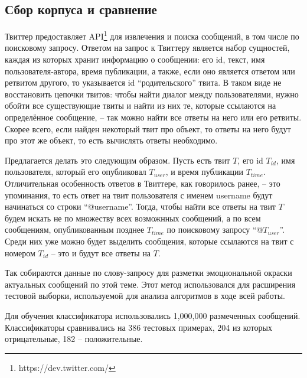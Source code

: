 \subsection{Сбор корпуса и сравнение}\label{compare}

Твиттер предоставляет API\footnote{https://dev.twitter.com/} для извлечения и поиска сообщений, в
том числе по поисковому запросу. Ответом на запрос к Твиттеру является набор сущностей, каждая из
которых хранит информацию о сообщении: его id, текст, имя пользователя-автора,
время публикации, а также, если оно является ответом или ретвитом другого, то указывается id
``родительского'' твита. В таком виде не восстановить цепочки твитов: чтобы найти диалог
между пользователями, нужно обойти все существующие твиты и найти из них те, которые ссылаются на
определённое сообщение, -- так можно найти все ответы на него или его ретвиты. Скорее всего, если
найден некоторый твит про объект, то ответы на него будут про этот же объект, то есть вычислять
ответы необходимо.

Предлагается делать это следующим образом. Пусть есть твит $T$, его id $T_{id}$, имя пользователя,
который его опубликовал $T_{user}$, и время публикации $T_{time}$. Отличительная особенность ответов
в Твиттере, как говорилось ранее, -- это упоминания, то есть ответ на твит пользователя с именем username
будут начинаться со строки ``@username''. Тогда, чтобы найти все ответы на твит $T$ будем искать не
по множеству всех возможнных сообщений, а по всем сообщениям, опубликованным позднее $T_{time}$ по
поисковому запросу ``@$T_{user}$''. Среди них уже можно будет выделить сообщения, которые ссылаются
на твит с номером $T_{id}$ -- это и будут все ответы на $T$.

Так собираются данные по слову-запросу для разметки эмоциональной окраски актуальных сообщений по
этой теме. Этот метод использовался для расширения тестовой выборки, используемой для анализа
алгоритмов в ходе всей работы.

Для обучения классификатора использовались 1,000,000 размеченных сообщений. Классификаторы сравнивались
на 386 тестовых примерах, 204 из которых отрицательные, 182 -- положительные.

